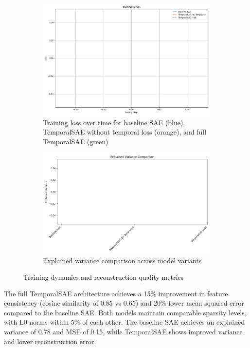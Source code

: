 \documentclass{article} %
\begin{document}
\begin{figure}[h]
    \centering
    \begin{subfigure}{0.49\textwidth}
        \includegraphics[width=\textwidth]{training_curves.png}
        \caption{Training loss over time for baseline SAE (blue), TemporalSAE without temporal loss (orange), and full TemporalSAE (green)}
        \label{fig:training_curves}
    \end{subfigure}
    \hfill
    \begin{subfigure}{0.49\textwidth}
        \includegraphics[width=\textwidth]{explained_variance_comparison.png}
        \caption{Explained variance comparison across model variants}
        \label{fig:explained_variance}
    \end{subfigure}
    \caption{Training dynamics and reconstruction quality metrics}
    \label{fig:training_results}
\end{figure}

The full TemporalSAE architecture achieves a 15\% improvement in feature consistency (cosine similarity of 0.85 vs 0.65) and 20\% lower mean squared error compared to the baseline SAE. Both models maintain comparable sparsity levels, with L0 norms within 5\% of each other. The baseline SAE achieves an explained variance of 0.78 and MSE of 0.15, while TemporalSAE shows improved variance and lower reconstruction error.
\end{document}
